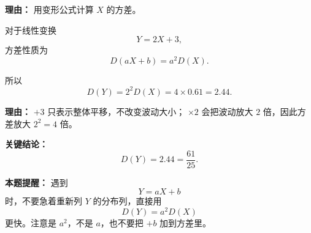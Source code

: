 \begin{examplebox}
\begin{description}[style=nextline, leftmargin=2.8em, labelsep=0.5em, itemsep=0.45em]
		      \par\textbf{理由：}
		      用变形公式计算 $X$ 的方差。

		\item[\textbf{第五步（利用方差性质求 $D(Y)$）：}]
		      对于线性变换
		      \[
			      Y=2X+3,
		      \]
		      方差性质为
		      \[
			      D(aX+b)=a^2D(X).
		      \]

		      所以
		      \[
			      D(Y)=2^2D(X)=4\times0.61=2.44.
		      \]

		      \par\textbf{理由：}
		      $+3$ 只表示整体平移，不改变波动大小；
		      $\times2$ 会把波动放大 $2$ 倍，因此方差放大 $2^2=4$ 倍。
	\end{description}

	\textbf{\textcolor{CExample}{关键结论：}}
	\[
		\boxed{D(Y)=2.44=\frac{61}{25}}.
	\]

	\textbf{\textcolor{CExample}{本题提醒：}}
	遇到
	\[
		Y=aX+b
	\]
	时，不要急着重新列 $Y$ 的分布列，直接用
	\[
		D(Y)=a^2D(X)
	\]
	更快。注意是 $a^2$，不是 $a$，也不要把 $+b$ 加到方差里。
\end{examplebox}